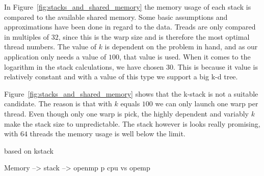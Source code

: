 In Figure~\ref{fig:stacks_and_shared_memory} the memory usage of each stack is compared to the available shared memory. Some basic assumptions and approximations have been done in regard to the data. Treads are only compared in multiples of $32$, since this is the warp size and is therefore the most optimal thread numbers. The value of $k$ is dependent on the problem in hand, and as our application only needs a value of $100$, that value is used. When it comes to the logarithm in the stack calculations, we have chosen $30$.  This is because it value is relatively constant and with a value of this type we support a  big k-d tree.


Figure~\ref{fig:stacks_and_shared_memory} shows that the k-stack is not a suitable candidate. The reason is that with $k$ equals $100$ we can only launch one warp per thread. Even though only one warp is pick, the highly dependent and variably $k$ make the stack size to unpredictable. The stack however is looks really promising, with $64$ threads the memory usage is well below the limit.



based on kstack






Memory --> stack  --> openmp
p
cpu vs opemp


















